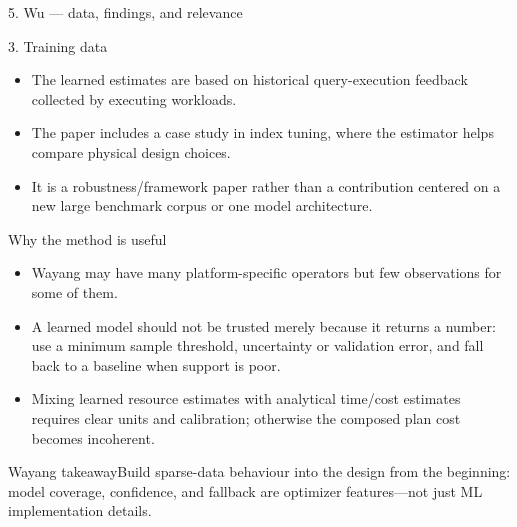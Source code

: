 \documentclass[aspectratio=169,10pt]{beamer}
\newcommand{\takeaway}[1]{\begin{block}{Wayang takeaway}#1\end{block}}
\begin{document}
\begin{frame}[shrink=10]{5. Wu — data, findings, and relevance}
\small
\begin{block}{3. Training data}
\begin{itemize}\setlength\itemsep{2pt}
  \item The learned estimates are based on historical query-execution feedback collected by executing workloads.
  \item The paper includes a case study in index tuning, where the estimator helps compare physical design choices.
  \item It is a robustness/framework paper rather than a contribution centered on a new large benchmark corpus or one model architecture.
\end{itemize}
\end{block}
\begin{block}{Why the method is useful}
\begin{itemize}\setlength\itemsep{2pt}
  \item Wayang may have many platform-specific operators but few observations for some of them.
  \item A learned model should not be trusted merely because it returns a number: use a minimum sample threshold, uncertainty or validation error, and fall back to a baseline when support is poor.
  \item Mixing learned resource estimates with analytical time/cost estimates requires clear units and calibration; otherwise the composed plan cost becomes incoherent.
\end{itemize}
\end{block}
\takeaway{Build sparse-data behaviour into the design from the beginning: model coverage, confidence, and fallback are optimizer features—not just ML implementation details.}
\end{frame}

\end{document}
